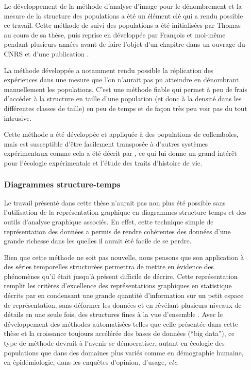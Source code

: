Le développement de la méthode d'analyse d'image pour le dénombrement et la
mesure de la structure des populations a été un élément clé qui a rendu possible
ce travail. Cette méthode de suivi des populations a été initialisées par Thomas
\textcites{tully2004a} au cours de sa thèse, puis reprise en développée par
François \textcites{mallard2013b} et moi-même pendant plusieurs années avant de
faire l'objet d'un chapitre dans un ouvrage du CNRS \autocites{le-galliard2012a}
et d'une publication \autocites{mallard2013a}.

La méthode développée a notamment rendu possible la réplication des expériences
dans une mesure que l'on n'aurait pas pu atteindre en dénombrant manuellement
les populations. C'est une méthode fiable qui permet à peu de frais d'accéder à la
structure en taille d'une population (et donc à la densité dans les différentes
classes de taille) en peu de temps et de façon très peu voir pas du tout
intrusive.

Cette méthode a été développée et appliquée à des populations de collemboles,
mais est susceptible d'être facilement transposée à d'autres systèmes
expérimentaux comme cela a été décrit par \textcites{mallard2013a}, ce qui lui
donne un grand intérêt pour l'écologie expérimentale et l'étude des traits
d'histoire de vie.

\subsubsection{Diagrammes structure-temps}

Le travail présenté dans cette thèse n'aurait pas non plus été possible sans
l'utilisation de la représentation graphique en diagrammes structure-temps et
des outils d'analyse graphique associés. En effet, cette technique simple de
représentation des données a permis de rendre cohérentes des données d'une
grande richesse dans les quelles il aurait été facile de se perdre.

Bien que cette méthode ne soit pas nouvelle, nous pensons que son application à
des séries temporelles structurées permettra de mettre en évidence des
phénomènes qu'il était jusqu'à présent difficile de décrire. Cette
représentation remplit les critères d'excellence des représentations graphiques
en statistique décrits par \textcites{tufte1990a} en condensant une grande
quantité d'information sur un petit espace de représentation, sans déformer les
données et en révélant plusieurs niveaux de détails en une seule fois, des
structures fines à la vue d'ensemble \autocites{tufte2001a}. Avec le
développement des méthodes automatisées telles que celle présentée dans cette
thèse \autocites[voir aussi ][]{le-galliard2012a} et la croissance toujours
accélérée des bases de données (``big data''), ce type de méthode devrait à
l'avenir se démocratiser, autant en écologie des populations que dans des
domaines plus variés comme en démographie humaine, en épidémiologie, dans les
enquêtes d'opinion, d'usage, \textit{etc}.


